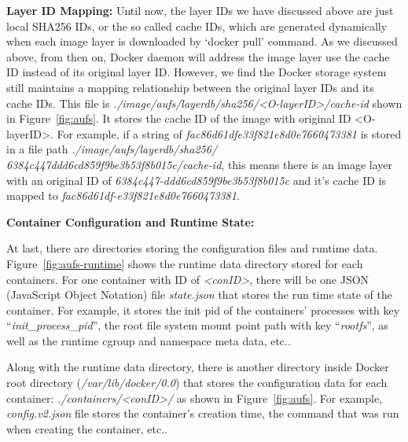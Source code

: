 \textbf{Layer ID Mapping:}  
Until now, the layer IDs we have discussed above are just local SHA256 IDs, or the so called cache IDs, which are generated dynamically when each image layer is downloaded by `docker pull' command. As we discussed above, from then on, Docker daemon will address the image layer use the cache ID instead of its original layer ID.
However, we find the Docker storage system still maintains a mapping relationship between the original layer IDs and its cache IDs. This file is \textit{./image/aufs/layerdb/sha256/<O-layerID>/cache-id} shown in Figure~\ref{fig:aufs}.
It stores the cache ID of the image with original ID <O-layerID>. For example, if a string of \textit{
fac86d61dfe33f821e8d0e7660473381} is stored in a file path \textit{./image/aufs/layerdb/sha256/
6384c447ddd6cd859f9be3b53f8b015c/cache-id}, this means there is an image layer with an original ID of \textit{
6384c447-ddd6cd859f9be3b53f8b015c} and it's cache ID is mapped to \textit{
fac86d61df-e33f821e8d0e7660473381}.



\textbf{Container Configuration and Runtime State:}

At last, there are directories storing the configuration files and runtime data. Figure~\ref{fig:aufs-runtime} shows the runtime data directory stored for each containers. For one container with ID of \textit{<conID>}, there will be one JSON (JavaScript Object Notation)  file \textit{state.json} that stores the run time state of the container. For example, it stores the init pid of the containers' processes with key ``\textit{init\_process\_pid}'', the root file system mount point path with key ``\textit{rootfs}'', as well as the runtime cgroup and namespace meta data, etc.. 

Along with the runtime data directory, there is another directory inside Docker root directory (\textit{/var/lib/docker/0.0}) that stores the configuration data for each container: \textit{./containers/<conID>/} as shown in Figure~\ref{fig:aufs}. For example, \textit{ config.v2.json} file stores the container's creation time, the command that was run when creating the container, etc..



